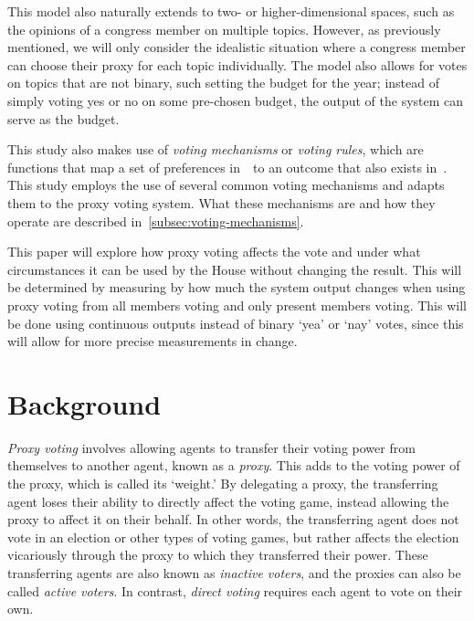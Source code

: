 This model also naturally extends to two- or higher-dimensional spaces, such as
the opinions of a congress member on multiple topics.
However, as previously mentioned, we will only consider the idealistic
situation where a congress member can choose their proxy for each topic individually.
The model also allows for votes on topics that are not binary, such setting the
budget for the year;
instead of simply voting yes or no on some pre-chosen budget, the output of the system
can serve as the budget.


This study also makes use of \textit{voting mechanisms} or \textit{voting rules},
which are functions that map a set of preferences in~\systemspace\ to an outcome that
also exists in~\systemspace.
%
%
This study employs the use of several common voting mechanisms and adapts them to the
proxy voting system.
What these mechanisms are and how they operate are described
in~\autoref{subsec:voting-mechanisms}.

This paper will explore how proxy voting affects the vote and under what
circumstances it can be used by the House without changing the result.
This will be determined by measuring by how much the system output changes when using
proxy voting from all members voting and only present members voting.
This will be done using continuous outputs instead of binary `yea' or `nay' votes,
since this will allow for more precise measurements in change.


\section{Background}\label{sec:background}
\textit{Proxy voting} involves allowing agents to transfer their voting power
from themselves to another agent, known as a \textit{proxy}.
This adds to the voting power of the proxy, which is called its `weight.'
By delegating a proxy, the transferring agent loses their ability to directly affect the
voting game, instead allowing the proxy to affect it on their behalf.
In other words, the transferring agent does not vote in an election or other types of
voting games, but rather affects the election vicariously through the proxy to which
they transferred their power.
These transferring agents are also known as \textit{inactive voters}, and the
proxies can also be called \textit{active voters}.
In contrast, \textit{direct voting} requires each agent to vote on their own.

